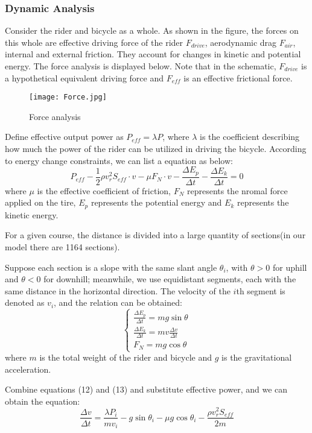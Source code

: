 \documentclass{mcmthesis}
\begin{document}
\subsubsection{Dynamic Analysis}
Consider the rider and bicycle as a whole. As shown in the figure, the forces on this whole are effective driving force of the rider $F_{drive}$, aerodynamic drag $F_{air}$, internal and external friction. They account for changes in kinetic and potential energy. The force analysis is displayed below. Note that in the schematic, $F_{drive}$ is a hypothetical equivalent driving force and $F_{eff}$ is an effective frictional force.
\begin{figure}[h]
	\centering
	\texttt{[image: Force.jpg]}
	\caption{Force analysis} 
\end{figure}

Define effective output power as $P_{eff}=\lambda P$, where $\lambda$ is the coefficient describing how much the power of the rider can be utilized in driving the bicycle. According to energy change constraints, we can list a equation as below:
\begin{equation}
	P_{eff}-\frac{1}{2}\rho v_r^2  S_{eff}\cdot v-\mu F_N\cdot v-\frac{\Delta E_p}{\Delta t}-\frac{\Delta E_k}{\Delta t}=0
\end{equation}
where $\mu$ is the effective coefficient of friction, $F_N$ represents the nromal force applied on the tire, $E_p$ represents the potential energy and $E_k$ represents the kinetic energy.

For a given course, the distance is divided into a large quantity of sections(in our model there are 1164 sections). 

Suppose each section is a slope with the same slant angle $\theta_i$, with $\theta >0$ for uphill and $\theta <0$ for downhill; meanwhile, we use equidistant segments, each with the same distance in the horizontal direction. The velocity of the $i$th segment is denoted as $v_i$, and the relation can be obtained:
\begin{equation}
	\begin{cases} 	\frac{\Delta E_p}{\Delta t}=mg\sin\theta\\
		\frac{\Delta E_k}{\Delta t}=mv\frac{\Delta v}{\Delta t}\\
		F_N=mg\cos\theta
	\end{cases}
\end{equation}
where $m$ is the total weight of the rider and bicycle and $g$ is the gravitational acceleration.

Combine equations (12) and (13) and substitute effective power, and we can obtain the equation:
\begin{equation}
	\frac{\Delta v}{\Delta t}=\frac{\lambda P_i}{mv_i}-g\sin\theta_i-\mu g\cos\theta_i-\frac{\rho v_r^2 S_{eff}}{2m}
\end{equation}
\end{document}
